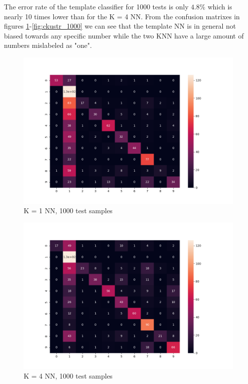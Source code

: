 \documentclass{article}
\begin{document}
The error rate of the template classifier for 1000 tests is only $4.8\%$ which is nearly 10 times lower than for the K = 4 NN.
From the confusion matrixes in figures \ref{fig:NN_1000}-\ref{fig:ckustr_1000}  we can see that the template NN is in general not biased towards any specific number while the two KNN have a large amount of numbers mislabeled as "one". 
\newline
\begin{figure}[htbp]
  \centering
  \includegraphics[width=\textwidth]{confusion_matrixes/NN_1000.png} 
  \caption{K = 1 NN, 1000 test samples}
  \label{fig:NN_1000}
\end{figure}

\begin{figure}[htbp]
  \centering
  \includegraphics[width=\textwidth]{confusion_matrixes/KNN4_1000.png} 
  \caption{K = 4 NN, 1000 test samples}
  \label{fig:KNN_1000}
\end{figure}
\end{document}
